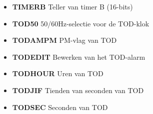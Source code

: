 \begin{itemize}
\item{\bf{TIMERB}} Teller van timer B (16-bits)
\item{\bf{TOD50}} 50/60Hz-selectie voor de TOD-klok
\item{\bf{TODAMPM}} PM-vlag van TOD
\item{\bf{TODEDIT}} Bewerken van het TOD-alarm
\item{\bf{TODHOUR}} Uren van TOD
\item{\bf{TODJIF}} Tienden van seconden van TOD
\item{\bf{TODSEC}} Seconden van TOD
\end{itemize}
